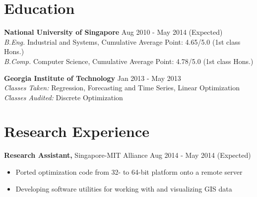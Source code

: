 \documentclass[margin]{res}
\begin{document}
 
 
 
\begin{resume}
 


\section{Education} 
{\bf National University of Singapore}  \hfill Aug 2010 - May 2014 (Expected) \\
\textit{B.Eng.} Industrial and Systems, Cumulative Average Point: 4.65/5.0 (1st class Hons.) \\
\textit{B.Comp.} Computer Science, Cumulative Average Point: 4.78/5.0 (1st class Hons.)

{\bf Georgia Institute of Technology}  \hfill Jan 2013 - May 2013\\
\textit{Classes Taken:} Regression, Forecasting and Time Series, Linear Optimization \\
\textit{Classes Audited:} Discrete Optimization

\section{Research Experience}
{\bf Research Assistant,} Singapore-MIT Alliance \hfill Aug 2014 - May 2014 (Expected)

\begin{itemize} \itemsep -2pt  %
\item Ported optimization code from 32- to 64-bit platform onto a remote server
\item Developing software utilities for working with and visualizing GIS data
\end{itemize}
 

\end{resume}
\end{document}
